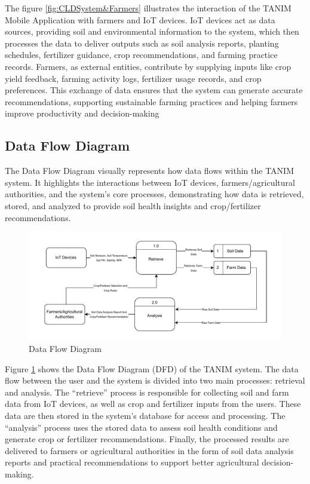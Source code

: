 {	The figure \ref{fig:CLDSystem&Farmers} illustrates the interaction of the TANIM Mobile Application with farmers and IoT devices. IoT devices act as data sources, providing soil and environmental information to the system, which then processes the data to deliver outputs such as soil analysis reports, planting schedules, fertilizer guidance, crop recommendations, and farming practice records. Farmers, as external entities, contribute by supplying inputs like crop yield feedback, farming activity logs, fertilizer usage records, and crop preferences. This exchange of data ensures that the system can generate accurate recommendations, supporting sustainable farming practices and helping farmers improve productivity and decision-making
	
	\subsection{Data Flow Diagram}
	The Data Flow Diagram visually represents how data flows within the TANIM system. It highlights the interactions between IoT devices, farmers/agricultural authorities, and the system’s core processes, demonstrating how data is retrieved, stored, and analyzed to provide soil health insights and crop/fertilizer recommendations.
	
	\begin{figure}[H]
		\centering
		\caption{Data Flow Diagram}
		\label{fig:DFD}
		\includegraphics[width=1\textwidth]{figures/DFD.pdf}
	\end{figure}
	
	Figure \ref{fig:DFD} shows the Data Flow Diagram (DFD) of the TANIM system. The data flow between the user and the system is divided into two main processes: retrieval and analysis. The “retrieve” process is responsible for collecting soil and farm data from IoT devices, as well as crop and fertilizer inputs from the users. These data are then stored in the system’s database for access and processing. The “analysis” process uses the stored data to assess soil health conditions and generate crop or fertilizer recommendations. Finally, the processed results are delivered to farmers or agricultural authorities in the form of soil data analysis reports and practical recommendations to support better agricultural decision-making.
	
}
